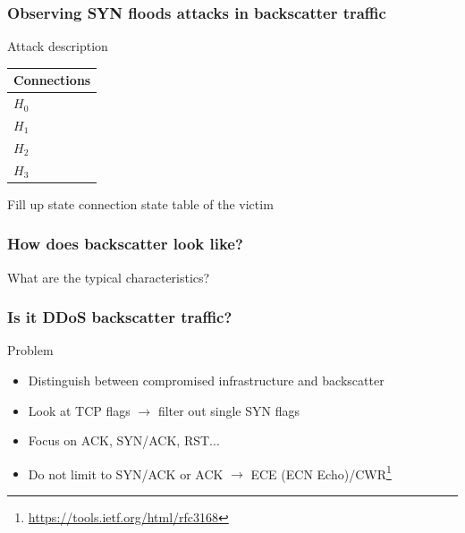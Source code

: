 \documentclass{beamer}
\begin{document}
\begin{frame}
\frametitle{Observing SYN floods attacks in backscatter traffic}
Attack description



\begin{center}
    \begin{tabular}{|l|}
        \hline
        Connections\\
        \hline
        $H_{0}$\\
        \hline
        $H_{1}$\\
        \hline
        $H_{2}$\\
        \hline
        $H_{3}$\\
        \hline
    \end{tabular}
\end{center}

\begin{center}
Fill up state connection state table of the victim
\end{center}

\end{frame}

\begin{frame}
\frametitle{How does backscatter look like?}

\begin{center}
    \alert{What are the typical characteristics?}
\end{center}
\end{frame}
\begin{frame}
    \frametitle{Is it DDoS backscatter traffic?}
    \begin{block}{Problem}
        \begin{itemize}
            \item Distinguish between compromised infrastructure and backscatter
            \item Look at TCP flags $\to$ filter out single SYN flags
            \item Focus on ACK, SYN/ACK, RST...
            \item Do not limit to SYN/ACK or ACK $\to$ ECE (ECN Echo)/CWR\footnote{\url{https://tools.ietf.org/html/rfc3168}}
        \end{itemize}
    \end{block}
    
\end{frame}
\end{document}
